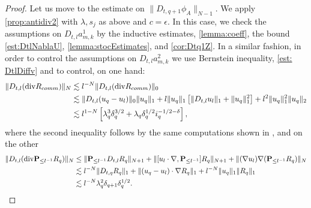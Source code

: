 \documentclass[10pt,a4paper]{amsart}
\numberwithin{equation}{section}
\numberwithin{corollario}{section}
\numberwithin{lemma}{section}
\numberwithin{prop}{section}
\theoremstyle{definition}
\theoremstyle{remark}
\newcommand{\dvg}{\mathord{{\rm div}}}
\newcommand{\proj}{\mathbf{P}}
\newcommand{\qq}{_{q+1}}
\begin{document}
\begin{proof}
Let us move to the estimate on $\|D_{t,q+1}\phi_A\|_{N-1}$. We apply \autoref{prop:antidiv2} with $\lambda,s_j$ as above and $c=\epsilon$.
In this case, we check the assumptions on $D_{t,l}a_{m,k}^1$ by the inductive estimates, \autoref{lemma:coeff}, the bound \eqref{est:DtlNablaU}, \autoref{lemma:stocEstimates}, and \autoref{cor:Dtq1Z}.
In a similar fashion, in order to control the assumptions on $D_{t,l} a_{m,k}^2$ we use Bernstein inequality, \eqref{est: DtlDiffv} and \cite[Lemma A.4]{DLK23} to control, on one hand:
\begin{align}
    \|D_{t,l}(\dvg R_{comm})\|_N &\lesssim l^{-N}\|D_{t,l}(\dvg R_{comm})\|_0 
    \\
    &\lesssim
    \|D_{t,l}(u_q-u_l)\|_0\|u_q\|_1+l\|u_q\|_1\left[\|D_{t,l}u_l\|_1+\|u_q\|_1^2\right]+l^2\|u_q\|_1^2\|u_q\|_2
    \\
    &\lesssim l^{1-N}\left[\lambda_q^3\delta_q^{3/2}+\lambda_q\delta_q^{1/2}i_q^{-1/2-\delta}\right],
\end{align}
where the second inequality follows by the same computations shown in \cite[Lemma 5.2]{DLK23}, and on the other
\begin{align}  
        \|D_{t,l}(\dvg \proj_{\le l^{-1}}R_q)\|_N&\le\| \proj_{\le l^{-1}}D_{t,l}R_q\|_{N+1}+
        \| [u_l\cdot \nabla, \proj_{\le l^{-1}}]R_q\|_{N+1}+\|(\nabla u_l)\nabla( \proj_{\le l^{-1}}R_q)\|_N\\ &\lesssim l^{-N}\|D_{t,q}R_q\|_1+\|(u_q-u_l)\cdot \nabla R_q\|_1+l^{-N}\|u_q\|_1\|R_q\|_1\\
        &\lesssim l^{-N}\lambda^2_q\delta\qq\delta_q^{1/2}.
\end{align}


\end{proof}
\end{document}
